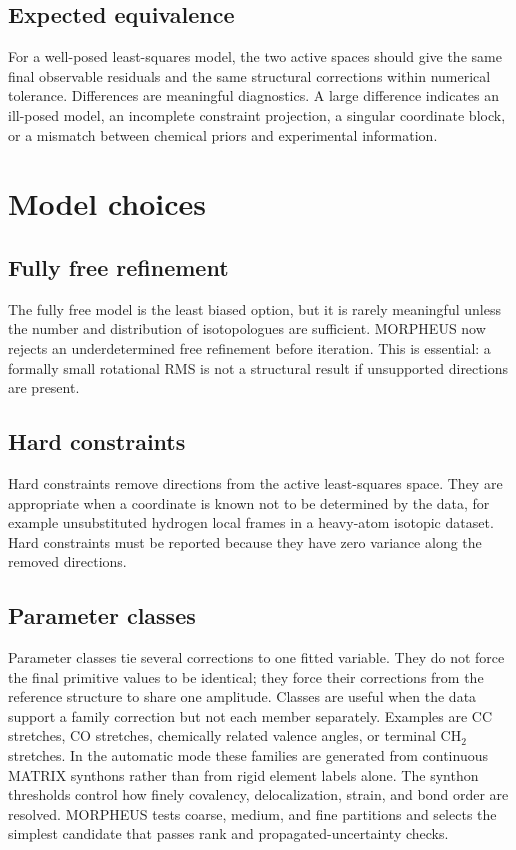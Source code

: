 \documentclass[11pt]{article}
\begin{document}
\subsection{Expected equivalence}
For a well-posed least-squares model, the two active spaces should give the same final
observable residuals and the same structural corrections within numerical tolerance.
Differences are meaningful diagnostics.  A large difference indicates an ill-posed
model, an incomplete constraint projection, a singular coordinate block, or a mismatch
between chemical priors and experimental information.

\section{Model choices}
\subsection{Fully free refinement}
The fully free model is the least biased option, but it is rarely meaningful unless the
number and distribution of isotopologues are sufficient.  MORPHEUS now rejects an
underdetermined free refinement before iteration.  This is essential: a formally small
rotational RMS is not a structural result if unsupported directions are present.

\subsection{Hard constraints}
Hard constraints remove directions from the active least-squares space.  They are
appropriate when a coordinate is known not to be determined by the data, for example
unsubstituted hydrogen local frames in a heavy-atom isotopic dataset.  Hard constraints
must be reported because they have zero variance along the removed directions.

\subsection{Parameter classes}
Parameter classes tie several corrections to one fitted variable.  They do not force
the final primitive values to be identical; they force their corrections from the
reference structure to share one amplitude.  Classes are useful when the data support a
family correction but not each member separately.  Examples are CC stretches, CO
stretches, chemically related valence angles, or terminal CH$_2$ stretches.
In the automatic mode these families are generated from continuous MATRIX synthons
rather than from rigid element labels alone.  The synthon thresholds control how
finely covalency, delocalization, strain, and bond order are resolved.  MORPHEUS
tests coarse, medium, and fine partitions and selects the simplest candidate that
passes rank and propagated-uncertainty checks.
\end{document}
